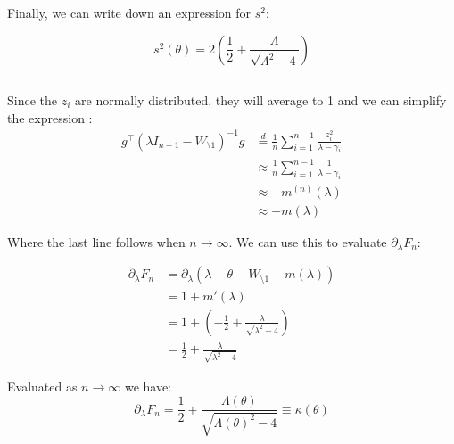\documentclass{article}
\begin{document}
Finally, we can write down an expression for $s^2$:

\begin{equation}
	s^2 \left( \theta \right) =2\left(\frac{1}{2} + \frac{\Lambda}{\sqrt{\Lambda^2 - 4}}\right)  
\end{equation}

\subsection{}

Since the $z_i$ are normally distributed, they will average to 1 and we can simplify the expression : 
\begin{equation}
\begin{split}
	g^\top \left( \lambda I_{n-1} - W_{\setminus 1} \right)^{-1}g  &\stackrel{d}{=} \frac{1}{n} \sum^{n-1}_{i=1} \frac{z_i^2}{\lambda - \gamma_i}  \\ 
								       &\approx   \frac{1}{n} \sum^{n-1}_{i=1} \frac{1}{\lambda - \gamma_i}  \\ 
								       &\approx -m^{\left( n \right)}\left( \lambda \right) \\
								       & \approx - m{\left( \lambda \right)}
\end{split}
\end{equation}

Where the last line follows when $n\rightarrow\infty$. We can use this to evaluate $\partial_\lambda F_n$:

\begin{equation}
\begin{split}
	\partial_\lambda F_n &= \partial_\lambda \left( \lambda - \theta - W_{\setminus 1} + m{\left( \lambda \right)} \right) \\ 
			     &= 1  + m'{\left( \lambda \right)} \\
			     &= 1  + \left( -\frac{1}{2} + \frac{\lambda}{\sqrt{\lambda^2 - 4}}   \right)\\
			     &=\frac{1}{2} + \frac{\lambda}{\sqrt{\lambda^2 - 4}}  
\end{split}
\end{equation}

Evaluated as $n\rightarrow\infty$ we have: 
\begin{equation}
	\partial_\lambda F_n  = \frac{1}{2} + \frac{\Lambda(\theta)}{\sqrt{\Lambda(\theta)^2 - 4}}  \equiv \kappa(\theta)
\end{equation}

\subsection{}
\end{document}
